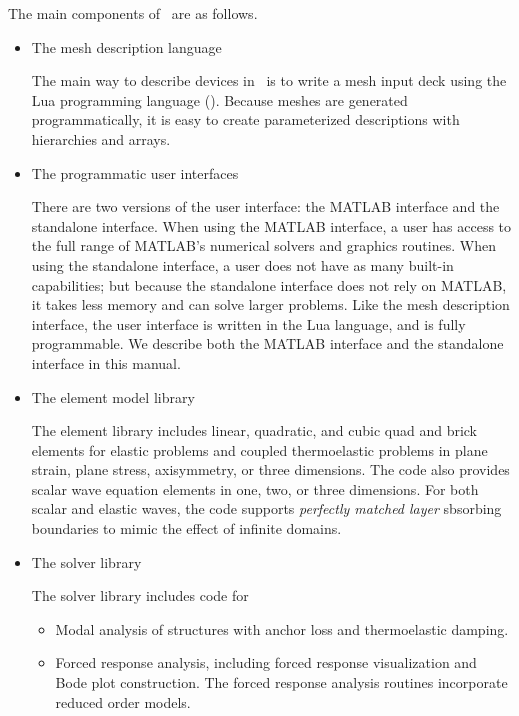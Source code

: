 The main components of \hiq\ are as follows.

\begin{itemize}
\item The mesh description language

The main way to describe devices in \hiq\ is to write a mesh input
deck using the Lua programming language ().
Because meshes are generated programmatically, it is easy to create
parameterized descriptions with hierarchies and arrays.

\item The programmatic user interfaces

There are two versions of the user interface: the MATLAB interface and
the standalone interface.  When using the MATLAB interface, a user has
access to the full range of MATLAB's numerical solvers and graphics
routines.  When using the standalone interface, a user does not have
as many built-in capabilities; but because the standalone interface
does not rely on MATLAB, it takes less memory and can solve larger
problems.  Like the mesh description interface, the user interface is
written in the Lua language, and is fully programmable.  We describe
both the MATLAB interface and the standalone interface in this manual.

\item The element model library

The element library includes linear, quadratic, and cubic quad and
brick elements for elastic problems and coupled thermoelastic problems
in plane strain, plane stress, axisymmetry, or three dimensions.  The
code also provides scalar wave equation elements in one, two, or three
dimensions.  For both scalar and elastic waves, the code supports
\emph{perfectly matched layer} sbsorbing boundaries to mimic the
effect of infinite domains.

\item The solver library

The solver library includes code for
\begin{itemize}
  \item Modal analysis of structures with anchor loss and
    thermoelastic damping.
  \item Forced response analysis, including forced response
    visualization and Bode plot construction.  The forced response
    analysis routines incorporate reduced order models.
\end{itemize}

\end{itemize}


